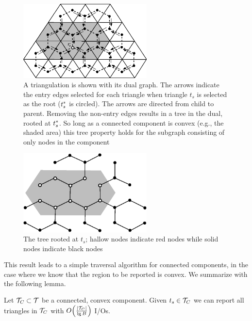   \begin{figure}[th]
	  \centering
		  \includegraphics[width=0.6\textwidth]{Fig7}
	  \caption[Dual graph with non-entry edges removed forms a tree]{ 
	    A triangulation is shown with its dual graph. 
	    The arrows indicate the entry edges selected for each triangle when
	    triangle $t_s$ is selected as the root ($t^*_s$ is circled). 
	    The arrows are directed from child to parent.
	    Removing the non-entry edges results in a tree in the dual, rooted at 
	    $t^*_s$.
	    So long as a connected component is convex (e.g., the shaded area) this 
	    tree property holds for the subgraph consisting of only nodes in the
	    component} \label{fig:imp_tree_entry}
  \end{figure}
	  
  \begin{figure}[th]
	  \centering 
	  \includegraphics[width=0.6\textwidth]{Fig8}
	  \caption[Tree rooted at $t_s$]{ The tree rooted at $t_s$; hallow
	  nodes indicate red nodes while solid nodes indicate black nodes} \label{fig:implicit_tree}
  \end{figure}

  This result leads to a simple traversal algorithm for connected 
  components, in the case where we know that the region to be reported 
  is convex.
  We summarize with the following lemma.

  \begin{lemma}\label{lem:report_convex_component}
  Let $\mathcal{T}_C \subset \mathcal{T}$ be a connected, convex component.
  Given $t_s \in \mathcal{T}_C$ we can report all triangles in $\mathcal{T}_C$ with 
  $O\!\left(\frac{|\mathcal{T}_C|}{\lg{B}}\right)$ I/Os.
  \end{lemma}

